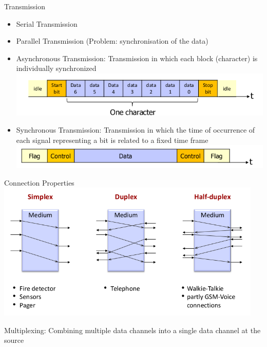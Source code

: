 \documentclass[11pt,ngerman]{article}
\begin{document}
Transmission
\begin{itemize}
	\item Serial Transmission
	\item Parallel Transmission (Problem: synchronisation of the data)
	\item Asynchronous Transmission:	Transmission	in	which	each	block	
(character)	is	individually	synchronized\\
\includegraphics[width=5in]{images/Selection_002.png}

	\item Synchronous Transmission:	Transmission	in	which	the	time	of	
occurrence	of	each	signal	representing	a	bit	is	related	to	a	fixed	time	
frame \\
\includegraphics[width=5in]{images/Selection_003.png}
\end{itemize}

Connection	Properties\\
\includegraphics[width=5in]{images/Selection_004.png}

Multiplexing:
Combining	multiple	data	
channels	into	a	single	data	
channel	at	the	source\\
\end{document}
